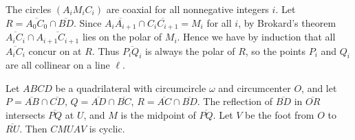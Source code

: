 The circles $(A_iM_iC_i)$ are coaxial for all nonnegative integers $i$. Let $R=\overline{A_0C_0}\cap\overline{BD}$. Since $\overline{A_iA_{i+1}}\cap\overline{C_iC_{i+1}}=M_i$ for all $i$, by Brokard's theorem $\overline{A_iC_i}\cap\overline{A_{i+1}C_{i+1}}$ lies on the polar of $M_i$. Hence we have by induction that all $\overline{A_iC_i}$ concur on at $R$. Thus $\overline{P_iQ_i}$ is always the polar of $R$, so the points $P_i$ and $Q_i$ are all collinear on a line $\ell$.
\begin{iclaim*}
    Let $ABCD$ be a quadrilateral with circumcircle $\omega$ and circumcenter $O$, and let $P=\overline{AB}\cap\overline{CD}$, $Q=\overline{AD}\cap\overline{BC}$, $R=\overline{AC}\cap\overline{BD}$. The reflection of $\overline{BD}$ in $\overline{OR}$ intersects $\overline{PQ}$ at $U$, and $M$ is the midpoint of $\overline{PQ}$. Let $V$ be the foot from $O$ to $\overline{RU}$. Then $CMUAV$ is cyclic.
\end{iclaim*}

